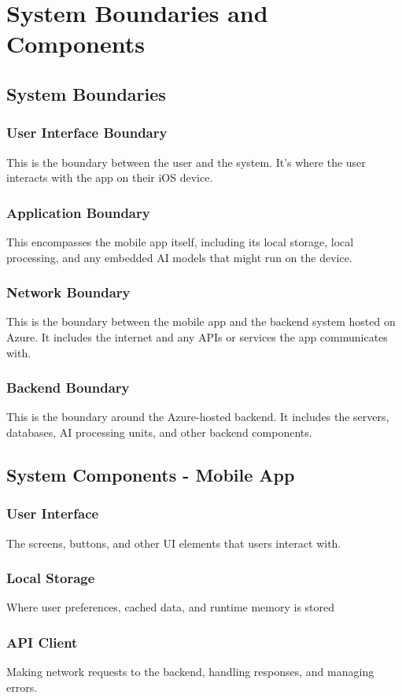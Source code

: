 \documentclass{article}
\begin{document}
    \section{System Boundaries and Components}

    \subsection{System Boundaries}
    \subsubsection{User Interface Boundary} This is the boundary between the user and the system. It's where the user interacts with the app on their iOS device.
    \subsubsection{Application Boundary} This encompasses the mobile app itself, including its local storage, local processing, and any embedded AI models that might run on the device.
    \subsubsection{Network Boundary} This is the boundary between the mobile app and the backend system hosted on Azure. It includes the internet and any APIs or services the app communicates with.
    \subsubsection{Backend Boundary} This is the boundary around the Azure-hosted backend. It includes the servers, databases, AI processing units, and other backend components.


    \subsection{System Components - Mobile App}
    \subsubsection{User Interface} The screens, buttons, and other UI elements that users interact with.
    \subsubsection{Local Storage} Where user preferences, cached data, and runtime memory is stored
    \subsubsection{API Client} Making network requests to the backend, handling responses, and managing errors.
\end{document}
